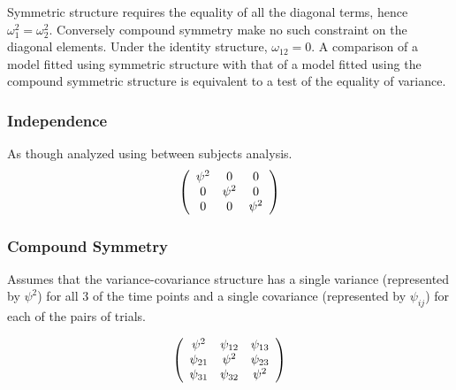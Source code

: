 \documentclass[12pt, a4paper]{report}
\theoremstyle{plain}
\theoremstyle{definition}
\theoremstyle{remark}
\begin{document}
	Symmetric structure requires the equality of all the diagonal terms, hence $\omega^2_1 = \omega^2_2$. Conversely compound symmetry make no such constraint on the diagonal elements. Under the identity structure, $\omega_{12} = 0$.
	A comparison of a model fitted using symmetric structure with that of a model fitted using the compound symmetric structure is equivalent to a test of the equality of variance.
	
	
	
	
	
	\subsubsection{Independence}
	
	As though analyzed using between subjects analysis.
	\[
	\left(
	\begin{array}{c c c}
	\psi^2 & 0 & 0   \\
	0 & \psi^2 & 0   \\
	0 & 0 & \psi^2   \\
	\end{array}%
	\right)
	\]
	
	
	
	\subsubsection{Compound Symmetry}
	
	Assumes that the variance-covariance structure has a single variance (represented by $\psi^2$)
	for all 3 of the time points and a single covariance (represented by $\psi_{ij}$) for each of the pairs of trials.
	
	\[
	\left(%
	\begin{array}{c c c}
	\psi^2 &  \psi_{12} & \psi_{13}   \\
	\psi_{21} & \psi^2 & \psi_{23}   \\
	\psi_{31} & \psi_{32} & \psi^2   \\
	\end{array}%
	\right)
	\]
	
	
	
\end{document}

